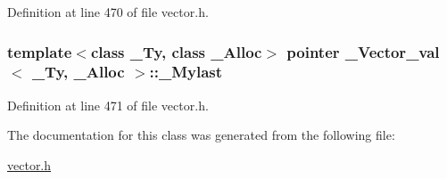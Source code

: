 Definition at line 470 of file vector.\+h.

\hypertarget{class___vector__val_a76c098026a887586c12c91249908ecd9}{
\subsubsection[{\+\_\+\+Mylast}]{\setlength{\rightskip}{0pt plus 5cm}template$<$class \+\_\+\+Ty, class \+\_\+\+Alloc$>$ {\bf pointer} {\bf \+\_\+\+Vector\+\_\+val}$<$ \+\_\+\+Ty, \+\_\+\+Alloc $>$\+::\+\_\+\+Mylast}}\label{class___vector__val_a76c098026a887586c12c91249908ecd9}


Definition at line 471 of file vector.\+h.



The documentation for this class was generated from the following file\+:\begin{DoxyCompactItemize}
\item 
\hyperlink{vector_8h}{vector.\+h}\end{DoxyCompactItemize}
